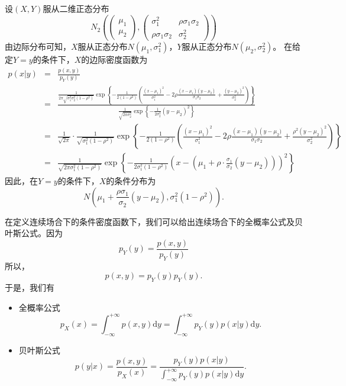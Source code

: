 \begin{example}
设$(X,Y)$服从二维正态分布$$N_{2}\left(\begin{pmatrix}
\mu_{1} \\
\mu_{2}
\end{pmatrix},\begin{pmatrix}
    \sigma_{1}^{2} & \rho \sigma_{1} \sigma_{2} \\
\rho \sigma_{1} \sigma_{2} & \sigma_{2}^{2}
\end{pmatrix}
\right)$$
由边际分布可知，$X$服从正态分布$N(\mu_{1},\sigma_{1}^{2})$，$Y$服从正态分布$N(\mu_{2},\sigma_{2}^{2})$。
在给定$Y=y$的条件下，$X$的边际密度函数为
\begin{eqnarray*}
 p(x |  y) &=&\frac{p(x, y)}{p_{Y}(y)} \\
&=&\frac{\frac{1}{2 \pi \sqrt{\sigma_{1}^{2} \sigma_{2}^{2}\left(1-\rho ^{2}\right)}} \exp \left\{-\frac{1}{2\left(1-\rho ^{2}\right)}\left(\frac{(x-\mu_{1})^{2}}{\sigma_{1}^{2}}-2 \rho  \frac{\left(x-\mu_{1}\right)\left(y-\mu_{2}\right)}{\sigma_{1} \sigma_{2}}+\frac{\left(y-\mu_{2}\right)^{2}}{\sigma_{2}^{2}}\right)\right\}}{\frac{1}{\sqrt{2 \pi \sigma_{2}^{2}}} \exp \left\{-\frac{1}{2 \sigma_{2}^{2}}\left(y-\mu_{2}\right)^{2}\right\}} \\
&=&\frac{1}{\sqrt{2 \pi}} \cdot \frac{1}{\sqrt{\sigma_{1}^{2}(1-\rho ^{2})}} \exp \left\{-\frac{1}{2\left(1-\rho^{2}\right)}\left(\frac{\left(x-\mu_{1}\right)^{2}}{\sigma_{1}^{2}}-2 \rho \frac{\left(x-\mu_{1}\right)\left(y-\mu_{2})\right.}{\sigma_{1} \sigma_{2}}+\frac{\rho^{2}\left(y-\mu_{2}\right)^{2}}{\sigma_{2}^{2}}\right)\right\}\\
&=&\frac{1}{\sqrt{2 \pi \sigma_{1}^{2}(1-\rho ^{2})}} \exp \left\{-\frac{1}{2 \sigma_{1}^{2}\left(1-\rho^{2}\right)}\left(x-\left(\mu_{1}+\rho \cdot \frac{\sigma_{1}}{\sigma_{2}}\left(y-\mu_{2}\right)\right)\right)^{2}\right\}
   \end{eqnarray*}
因此，在$Y=y$的条件下，$X$的条件分布为
$$ N\left(\mu_{1}+ \frac{\rho\sigma_{1}}{\sigma_{2}}\left(y-\mu_{2}\right), \sigma_{1}^{2}\left(1-\rho ^{2}\right)\right) .$$
\end{example}
\begin{remark}
在定义连续场合下的条件密度函数下，我们可以给出连续场合下的全概率公式及贝叶斯公式。因为
$$
p_Y(y)= \frac{p(x,y)}{p_Y(y)}
$$
所以，
$$
p(x,y) = p_Y(y)p_Y(y).
$$
于是，我们有
\begin{itemize}
    \item 全概率公式
    $$
    p_X(x) = \int_{-\infty}^{+\infty} p(x, y) \text{d} y =  \int_{-\infty}^{+\infty} p_{Y}(y) p(x  |  y) \text{d} y.
    $$
    \item 贝叶斯公式
    $$
    p(y|x) = \frac{p(x,y)}{p_{X}(x)} = \frac{p_Y(y)p(x|y)}{\int_{-\infty}^{+\infty} p_{Y}(y) p(x  |  y) \text{d} y}.
    $$
\end{itemize}
\end{remark}


